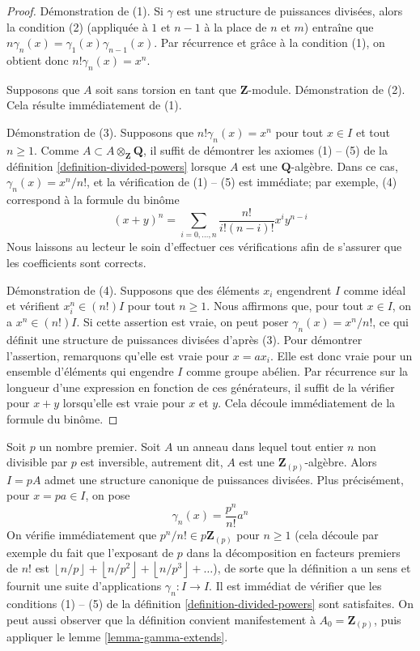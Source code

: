 \begin{proof}
Démonstration de (1). Si $\gamma$ est une structure de puissances divisées,
alors la condition (2) (appliquée à $1$ et $n-1$ à la place de $n$ et $m$)
entraîne que $n \gamma_n(x) = \gamma_1(x)\gamma_{n - 1}(x)$. Par récurrence
et grâce à la condition (1), on obtient donc $n! \gamma_n(x) = x^n$.

\medskip\noindent
Supposons que $A$ soit sans torsion en tant que $\mathbf{Z}$-module.
Démonstration de (2). Cela résulte immédiatement de (1).

\medskip\noindent
Démonstration de (3). Supposons que $n! \gamma_n(x) = x^n$ pour tout
$x \in I$ et tout $n \geq 1$. Comme
$A \subset A \otimes_{\mathbf{Z}} \mathbf{Q}$, il suffit de démontrer les
axiomes (1) -- (5) de la définition \ref{definition-divided-powers} lorsque
$A$ est une $\mathbf{Q}$-algèbre. Dans ce cas,
$\gamma_n(x) = x^n/n!$, et la vérification de (1) -- (5) est immédiate;
par exemple, (4) correspond à la formule du binôme
$$
(x + y)^n = \sum_{i = 0, \ldots, n} \frac{n!}{i!(n - i)!} x^iy^{n - i}
$$
Nous laissons au lecteur le soin d'effectuer ces vérifications afin de
s'assurer que les coefficients sont corrects.

\medskip\noindent
Démonstration de (4). Supposons que des éléments $x_i$ engendrent $I$
comme idéal et vérifient $x_i^n \in (n!)I$ pour tout $n \geq 1$. Nous affirmons
que, pour tout $x \in I$, on a $x^n \in (n!)I$. Si cette assertion est vraie, on
peut poser $\gamma_n(x) = x^n/n!$, ce qui définit une structure de puissances
divisées d'après (3). Pour démontrer l'assertion, remarquons qu'elle est vraie
pour $x = ax_i$. Elle est donc vraie pour un ensemble d'éléments qui engendre
$I$ comme groupe abélien. Par récurrence sur la longueur d'une expression en
fonction de ces générateurs, il suffit de la vérifier pour $x + y$ lorsqu'elle
est vraie pour $x$ et $y$. Cela découle immédiatement de la formule du binôme.
\end{proof}

\begin{example}
\label{example-ideal-generated-by-p}
Soit $p$ un nombre premier.
Soit $A$ un anneau dans lequel tout entier $n$ non divisible par $p$
est inversible, autrement dit, $A$ est une $\mathbf{Z}_{(p)}$-algèbre. Alors
$I = pA$ admet une structure canonique de puissances divisées. Plus précisément,
pour $x = pa \in I$, on pose
$$
\gamma_n(x) = \frac{p^n}{n!} a^n
$$
On vérifie immédiatement que $p^n/n! \in p\mathbf{Z}_{(p)}$
pour $n \geq 1$ (cela découle par exemple du fait que l'exposant de $p$
dans la décomposition en facteurs premiers de $n!$ est
$\left\lfloor n/p \right\rfloor + \left\lfloor n/p^2 \right\rfloor
+ \left\lfloor n/p^3 \right\rfloor + \ldots$),
de sorte que la définition a un sens et fournit une suite d'applications
$\gamma_n : I \to I$. Il est immédiat de vérifier que les conditions
(1) -- (5) de la définition \ref{definition-divided-powers} sont satisfaites.
On peut aussi observer que la définition convient manifestement à
$A_0 = \mathbf{Z}_{(p)}$, puis appliquer le
lemme \ref{lemma-gamma-extends}.
\end{example}

